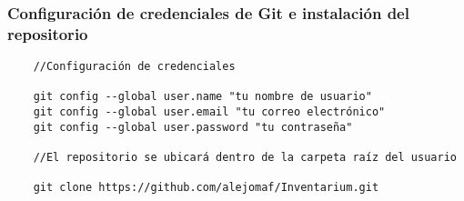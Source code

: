 \subsubsection{Configuración de credenciales de Git e instalación del repositorio}
\begin{verbatim}
    //Configuración de credenciales

    git config --global user.name "tu nombre de usuario"
    git config --global user.email "tu correo electrónico"
    git config --global user.password "tu contraseña"

    //El repositorio se ubicará dentro de la carpeta raíz del usuario
    
    git clone https://github.com/alejomaf/Inventarium.git
\end{verbatim}
